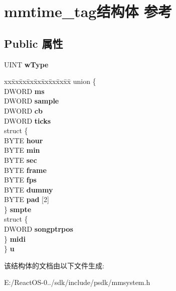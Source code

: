 \hypertarget{structmmtime__tag}{}\section{mmtime\+\_\+tag结构体 参考}
\label{structmmtime__tag}
\subsection*{Public 属性}
\begin{DoxyCompactItemize}
\item 
\mbox{\label{structmmtime__tag_ad463b08e91332065eaa3d459d622ae42}} 
U\+I\+NT {\bfseries w\+Type}
\item 
\mbox{\label{structmmtime__tag_a80335fc17b9c4ba0ccd71cbe43c42d7e}} 
\begin{tabbing}
xx\=xx\=xx\=xx\=xx\=xx\=xx\=xx\=xx\=\kill
union \{\\
\>DWORD {\bfseries ms}\\
\>DWORD {\bfseries sample}\\
\>DWORD {\bfseries cb}\\
\>DWORD {\bfseries ticks}\\
\>struct \{\\
\>\>BYTE {\bfseries hour}\\
\>\>BYTE {\bfseries min}\\
\>\>BYTE {\bfseries sec}\\
\>\>BYTE {\bfseries frame}\\
\>\>BYTE {\bfseries fps}\\
\>\>BYTE {\bfseries dummy}\\
\>\>BYTE {\bfseries pad} \mbox{[}2\mbox{]}\\
\>\} {\bfseries smpte}\\
\>struct \{\\
\>\>DWORD {\bfseries songptrpos}\\
\>\} {\bfseries midi}\\
\} {\bfseries u}\\

\end{tabbing}\end{DoxyCompactItemize}


该结构体的文档由以下文件生成\+:\begin{DoxyCompactItemize}
\item 
E\+:/\+React\+O\+S-\/0../sdk/include/psdk/mmsystem.\+h\end{DoxyCompactItemize}
